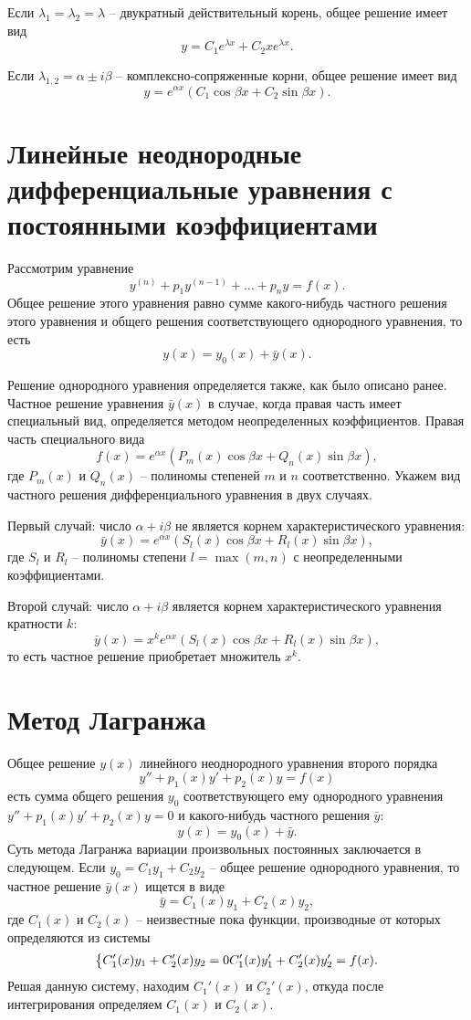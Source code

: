 \documentclass[a5paper, 11pt]{extbook}
\theoremstyle{definition}
\theoremstyle{definition}
\theoremstyle{definition}
\begin{document}
Если \(\lambda_1 = \lambda_2 = \lambda\) -- двукратный действительный корень, общее решение имеет вид
\[
    y = C_1 e^{\lambda x} + C_2 x e^{\lambda x}.
\]

Если \(\lambda_{1, 2} = \alpha \pm i \beta\) -- комплексно-сопряженные корни, общее решение имеет вид
\[
    y = e^{\alpha x} (C_1 \cos \beta x + C_2 \sin \beta x).
\]

\section{Линейные неоднородные дифференциальные уравнения с постоянными коэффициентами}

Рассмотрим уравнение
\[
    y^{(n)} + p_1 y^{(n - 1)} + \ldots + p_n y = f(x).
\]
Общее решение этого уравнения равно сумме какого-нибудь частного решения этого уравнения и общего решения соответствующего однородного уравнения, то есть
\[
    y(x) = y_0(x) + \bar{y}(x).
\]

Решение однородного уравнения определяется также, как было описано ранее. Частное решение уравнения \(\bar{y}(x)\) в случае, когда правая часть имеет специальный вид, определяется методом неопределенных коэффициентов. Правая часть специального вида
\[
    f(x) = e^{\alpha x} (P_m(x) \cos \beta x + Q_n(x) \sin \beta x),
\]
где \(P_m(x)\) и \(Q_n(x)\) -- полиномы степеней \(m\) и \(n\) соответственно. Укажем вид частного решения дифференциального уравнения в двух случаях.

Первый случай: число \(\alpha + i \beta\) не является корнем характеристического уравнения:
\[
    \bar{y}(x) = e^{\alpha x} (S_l(x) \cos \beta x + R_l(x) \sin \beta x),
\]
где \(S_l\) и \(R_l\) -- полиномы степени \(l = \max(m, n)\) с неопределенными коэффициентами.

Второй случай: число \(\alpha + i \beta\) является корнем характеристического уравнения кратности \(k\):
\[
    \bar{y}(x) = x^k e^{\alpha x} (S_l(x) \cos \beta x + R_l(x) \sin \beta x),
\]
то есть частное решение приобретает множитель \(x^k\).

\section{Метод Лагранжа}

Общее решение \(y(x)\) линейного неоднородного уравнения второго порядка
\[
    y'' + p_1(x)y' + p_2(x)y = f(x)
\]
есть сумма общего решения \(y_0\) соответствующего ему однородного уравнения \(y'' + p_1(x)y' + p_2(x)y = 0\) и какого-нибудь частного решения \(\bar{y}\):
\[
    y(x) = y_0(x) + \bar{y}.
\]
Суть метода Лагранжа вариации произвольных постоянных заключается в следующем. Если \(y_0 = C_1 y_1 + C_2 y_2\) -- общее решение однородного уравнения, то частное решение \(\bar{y}(x)\) ищется в виде
\[
    \bar{y} = C_1(x) y_1 + C_2(x) y_2,
\]
где \(C_1(x)\) и \(C_2(x)\) -- неизвестные пока функции, производные от которых определяются из системы
\[
    \begin{dcases}
        C_1'(x) y_1 + C_2'(x)y_2 = 0
        C_1'(x) y_1' + C_2'(x)y_2' = f(x).
    \end{dcases}
\]
Решая данную систему, находим \(C_1'(x)\) и \(C_2'(x)\), откуда после интегрирования определяем \(C_1(x)\) и \(C_2(x)\).
\end{document}
